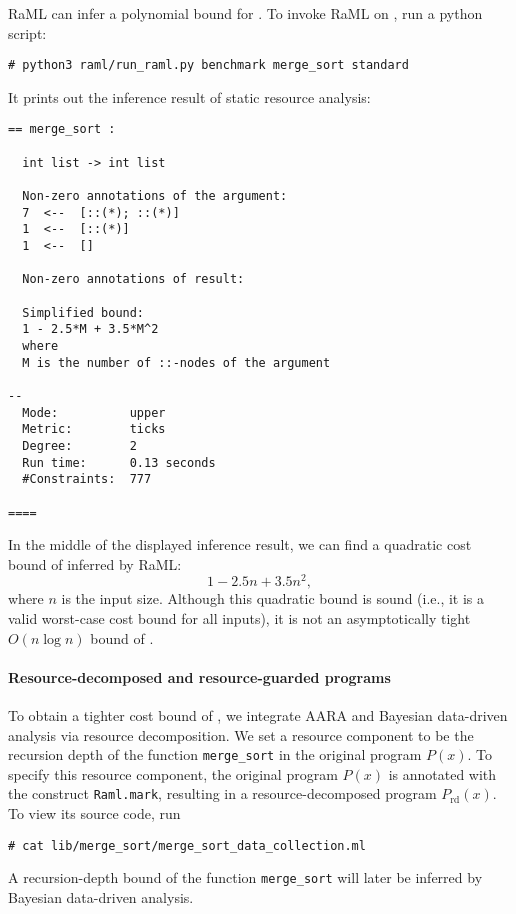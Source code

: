 RaML can infer a polynomial bound for \mergesort{}.
%
To invoke RaML on \mergesort{}, run a python script:
\begin{verbatim}
# python3 raml/run_raml.py benchmark merge_sort standard
\end{verbatim}
%
It prints out the inference result of static resource analysis:
\begin{Verbatim}[fontsize=\footnotesize]
== merge_sort :

  int list -> int list

  Non-zero annotations of the argument:
  7  <--  [::(*); ::(*)]
  1  <--  [::(*)]
  1  <--  []

  Non-zero annotations of result:

  Simplified bound:
  1 - 2.5*M + 3.5*M^2
  where
  M is the number of ::-nodes of the argument

--
  Mode:          upper
  Metric:        ticks
  Degree:        2
  Run time:      0.13 seconds
  #Constraints:  777

====
\end{Verbatim}
%
In the middle of the displayed inference result, we can find a quadratic cost
bound of \mergesort{} inferred by RaML:
\begin{equation}
  1 - 2.5 n + 3.5 n^2,
\end{equation}
where $n$ is the input size.
%
Although this quadratic bound is sound (i.e., it is a valid worst-case cost
bound for all inputs), it is not an asymptotically tight $O(n \log n)$ bound of
\mergesort{}.

\paragraph{Resource-decomposed and resource-guarded programs}

To obtain a tighter cost bound of \mergesort{}, we integrate AARA and Bayesian
data-driven analysis via resource decomposition.
%
We set a resource component to be the recursion depth of the function
\texttt{merge\_sort} in the original program $P(x)$.
%
To specify this resource component, the original program $P(x)$ is annotated
with the construct \texttt{Raml.mark}, resulting in a resource-decomposed
program $P_{\mathrm{rd}}(x)$.
%
To view its source code, run
\begin{verbatim}
# cat lib/merge_sort/merge_sort_data_collection.ml
\end{verbatim}
%
A recursion-depth bound of the function \texttt{merge\_sort} will later be
inferred by Bayesian data-driven analysis.

